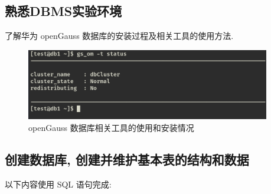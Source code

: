 \subsection{熟悉DBMS实验环境}
了解华为 openGauss 数据库的安装过程及相关工具的使用方法.

\begin{figure}[H]
  \begin{center}
    \includegraphics[width=0.95\textwidth,scale=0.5]{./figures/gauss_usage.png}
  \end{center}
  \caption{openGauss 数据库相关工具的使用和安装情况}
\end{figure}

\subsection{创建数据库, 创建并维护基本表的结构和数据}

以下内容使用 SQL 语句完成:

